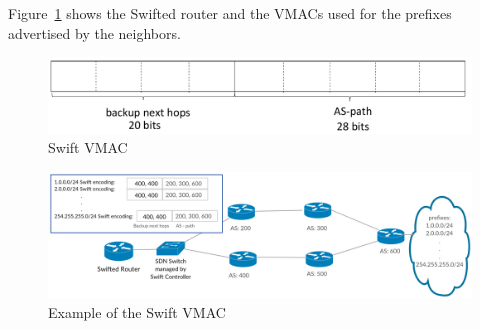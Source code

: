 Figure~\ref{fig:swift_vmac} shows the Swifted router and the VMACs used for the prefixes advertised by the neighbors.

\begin{figure}[h]
\center
\includegraphics[scale = 0.6]{Figures/swift_vmac3_cropped.pdf}
\caption{Swift VMAC}
\end{figure}


\begin{figure}[h]
\center
\includegraphics[scale = 0.24]{Figures/bckgrnd_swift_topology.pdf}
\caption{Example of the Swift VMAC}
\label{fig:swift_vmac}
\end{figure}








